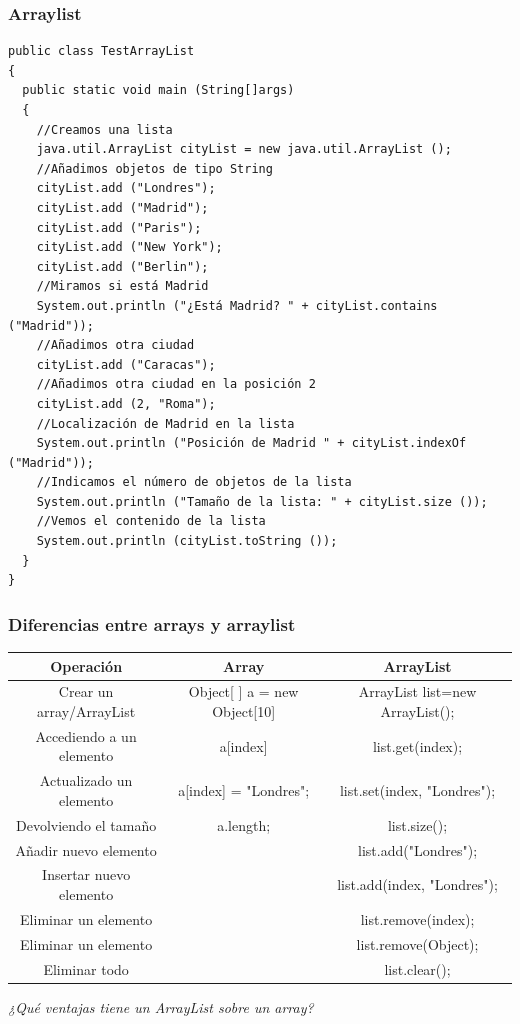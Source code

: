\documentclass{beamer}
\begin{document}
\begin{frame}[fragile]
\frametitle{Arraylist}
\begin{scriptsize}
\begin{verbatim}
public class TestArrayList
{
  public static void main (String[]args)
  {
    //Creamos una lista
    java.util.ArrayList cityList = new java.util.ArrayList ();
    //Añadimos objetos de tipo String
    cityList.add ("Londres");
    cityList.add ("Madrid");
    cityList.add ("Paris");
    cityList.add ("New York");
    cityList.add ("Berlin");
    //Miramos si está Madrid
    System.out.println ("¿Está Madrid? " + cityList.contains ("Madrid"));
    //Añadimos otra ciudad
    cityList.add ("Caracas");
    //Añadimos otra ciudad en la posición 2
    cityList.add (2, "Roma");
    //Localización de Madrid en la lista
    System.out.println ("Posición de Madrid " + cityList.indexOf ("Madrid"));
    //Indicamos el número de objetos de la lista
    System.out.println ("Tamaño de la lista: " + cityList.size ());
    //Vemos el contenido de la lista
    System.out.println (cityList.toString ());
  }
}
\end{verbatim}
\end{scriptsize}
\end{frame}

\begin{frame}
    \frametitle{Diferencias entre arrays y arraylist}
\begin{scriptsize}
\begin{tabular}{ccc}
\hline
Operación & Array &ArrayList\\
\hline
Crear un array/ArrayList &Object[ ] a = new Object[10] &ArrayList list=new ArrayList();\\
Accediendo a un elemento& a[index] & list.get(index);\\
Actualizado un elemento& a[index] = "Londres"; & list.set(index, "Londres");\\
Devolviendo el tamaño& a.length; &list.size();\\
Añadir nuevo elemento& &list.add("Londres");\\
Insertar nuevo elemento& & list.add(index, "Londres");\\
Eliminar un elemento&& list.remove(index);\\
Eliminar un elemento&& list.remove(Object);\\
Eliminar todo & & list.clear();\\
\hline
\end{tabular}
\end{scriptsize}
\pause
\begin{center}
\begin{Large}
\textit{¿Qué ventajas tiene un ArrayList sobre un array?
}
\end{Large}
\end{center}\end{frame}
\end{document}
